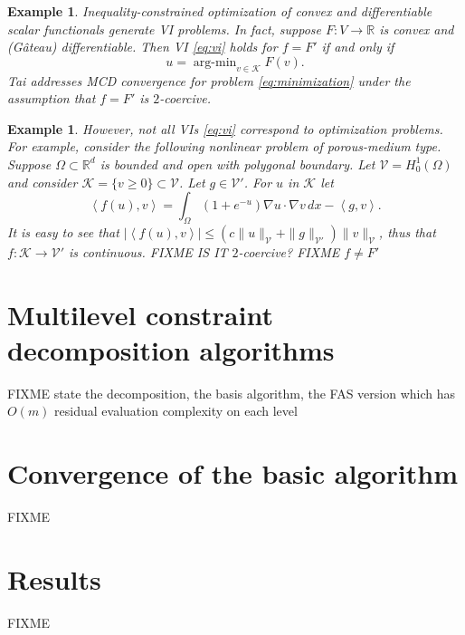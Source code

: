 \documentclass[letterpaper,final,12pt,reqno]{amsart}
\theoremstyle{cstyle}
\theoremstyle{dstyle}
\newtheorem{example}[theorem]{Example}
\numberwithin{equation}{section}
\numberwithin{figure}{section}
\numberwithin{table}{section}
\numberwithin{theorem}{section}
\newcommand{\RR}{\mathbb{R}}
\newcommand{\grad}{\nabla}
\newcommand{\cK}{\mathcal{K}}
\newcommand{\cV}{\mathcal{V}}
\newcommand{\ip}[2]{\left<#1,#2\right>}
\begin{document}
\begin{example}  Inequality-constrained optimization of convex and differentiable scalar functionals generate VI problems.  In fact, suppose $F:V \to \RR$ is convex and (G\^ateau) differentiable.  Then VI \eqref{eq:vi} holds for $f=F'$ if and only if
\begin{equation}
u = \operatorname{arg-min}_{v\in\cK} F(v). \label{eq:minimization}
\end{equation}
Tai \cite{Tai2003} addresses MCD convergence for problem \eqref{eq:minimization} under the assumption that $f=F'$ is $2$-coercive.
\end{example}

\begin{example}  However, not all VIs \eqref{eq:vi} correspond to optimization problems.  For example, consider the following nonlinear problem of porous-medium type.  Suppose $\Omega \subset \RR^d$ is bounded and open with polygonal boundary.  Let $\cV = H_0^1(\Omega)$ and consider $\cK = \{v\ge 0\} \subset \cV$.  Let $g\in \cV'$.  For $u$ in $\cK$ let
\begin{equation}
\ip{f(u)}{v} = \int_\Omega (1+e^{-u}) \grad u \cdot \grad v\,dx - \ip{g}{v}. \label{eq:nongradientexample}
\end{equation}
It is easy to see that $|\ip{f(u)}{v}| \le (c \|u\|_{\cV} + \|g\|_{\cV'}) \|v\|_{\cV}$, thus that $f:\cK \to \cV'$ is continuous.  FIXME IS IT $2$-coercive?  FIXME $f\ne F'$
\end{example}

\section{Multilevel constraint decomposition algorithms} \label{sec:algorithms}

FIXME state the decomposition, the basis algorithm, the FAS version which has $O(m)$ residual evaluation complexity on each level

\section{Convergence of the basic algorithm} \label{sec:convergence}

FIXME

\section{Results} \label{sec:results}

FIXME


\small

\bigskip


\end{document}
